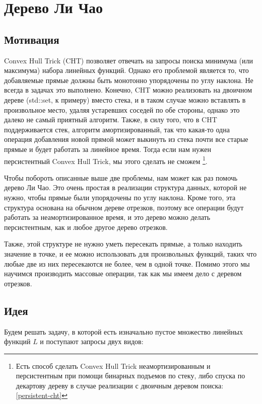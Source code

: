 \chapter{Дерево Ли Чао} \label{li-chao}

\section{Мотивация}

Convex Hull Trick (CHT) позволяет отвечать на запросы поиска минимума (или максимума) набора линейных функций. Однако его проблемой является то, что добавляемые прямые должны быть монотонно упорядочены по углу наклона. Не всегда в задачах это выполнено. Конечно, CHT можно реализовать на двоичном дереве (std::set, к примеру) вместо стека, и в таком случае можно вставлять в произвольное место, удаляя устаревших соседей по обе стороны, однако это далеко не самый приятный алгоритм. Также, в силу того, что в CHT поддерживается стек, алгоритм амортизированный, так что какая-то одна операция добавления новой прямой может выкинуть из стека почти все старые прямые и будет работать за линейное время. Тогда если нам нужен персистентный Convex Hull Trick, мы этого сделать не сможем \footnote{Есть способ сделать Convex Hull Trick неамортизированным и персистентным при помощи бинарных подъемов по стеку, либо спуска по декартову дереву в случае реализации с двоичным деревом поиска: \ref{persistent-cht}}.

Чтобы побороть описанные выше две проблемы, нам может как раз помочь дерево Ли Чао. Это очень простая в реализации структура данных, которой не нужно, чтобы прямые были упорядочены по углу наклона. Кроме того, эта структура основана на обычном дереве отрезков, поэтому все операции будут работать за неамортизированное время, и это дерево можно делать персистентным, как и любое другое дерево отрезков.

Также, этой структуре не нужно уметь пересекать прямые, а только находить значение в точке, и ее можно использовать для произвольных функций, таких что любые две из них пересекаются не более, чем в одной точке. Помимо этого мы научимся производить массовые операции, так как мы имеем дело с деревом отрезков.

\section{Идея}

Будем решать задачу, в которой есть изначально пустое множество линейных функций $L$ и поступают запросы двух видов:

